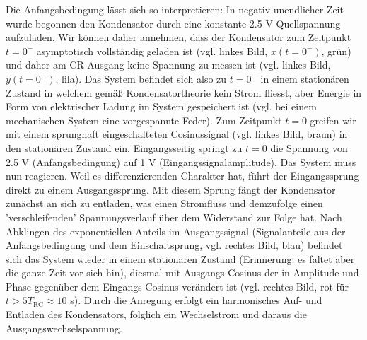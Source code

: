 \begin{Loesung}
Die Anfangsbedingung lässt sich so interpretieren: In negativ unendlicher Zeit wurde begonnen den Kondensator durch eine konstante 2.5 V Quellspannung aufzuladen. Wir können daher annehmen, dass der Kondensator zum Zeitpunkt $t=0^-$ asymptotisch vollständig geladen ist (vgl. linkes Bild, $x(t=0^-)$, grün) und daher am CR-Ausgang keine Spannung zu messen ist (vgl. linkes Bild, $y(t=0^-)$, lila). Das System befindet sich also zu $t=0^-$ in einem stationären Zustand in welchem gemäß Kondensatortheorie kein Strom fliesst, aber Energie in Form von elektrischer Ladung im System gespeichert ist (vgl. bei einem mechanischen System eine vorgespannte Feder). Zum Zeitpunkt $t=0$ greifen wir mit einem sprunghaft eingeschalteten Cosinussignal (vgl. linkes Bild, braun) in den stationären Zustand ein. Eingangsseitig springt zu $t=0$ die Spannung von 2.5 V (Anfangsbedingung) auf 1 V (Eingangssignalamplitude). Das System muss nun reagieren. Weil es differenzierenden Charakter hat, führt der Eingangssprung direkt zu einem Ausgangssprung. Mit diesem Sprung fängt der Kondensator zunächst an sich zu entladen, was einen Stromfluss und demzufolge einen 'verschleifenden' Spannungsverlauf über dem Widerstand zur Folge hat. Nach Abklingen des exponentiellen Anteils im Ausgangssignal (Signalanteile aus der Anfangsbedingung und dem Einschaltsprung, vgl. rechtes Bild, blau) befindet sich das System wieder in einem stationären Zustand (Erinnerung: es faltet aber die ganze Zeit vor sich hin), diesmal mit Ausgangs-Cosinus der in Amplitude und Phase gegenüber dem Eingangs-Cosinus verändert ist (vgl. rechtes Bild, rot für $t > 5 T_\text{RC} \approx 10$ s). Durch die Anregung erfolgt ein harmonisches Auf- und Entladen des Kondensators, folglich ein Wechselstrom und daraus die Ausgangswechselspannung.
\end{Loesung}
%




\newpage
